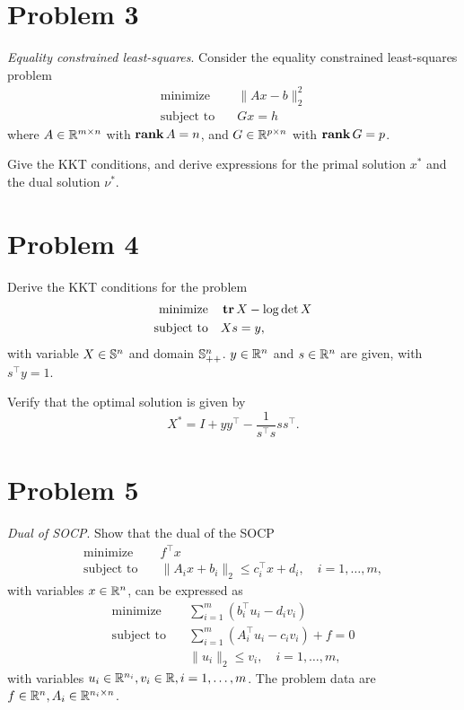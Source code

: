 \documentclass[11pt]{article}
\newcommand{\T}{^\top}          %
\begin{document}
\clearpage
\section*{Problem 3}
\textit{Equality constrained least-squares}. Consider the equality constrained least-squares problem
\begin{align*}
  \text{minimize} \quad & \|Ax - b\|^2_2\\
  \text{subject to} \quad & Gx = h
\end{align*}
where $A\in{{\mathbb{R}}}^{m\times n}$ with $\mathop{\textbf{rank}} A = n$, and $G \in{{\mathbb{R}}}^{p\times n}$ with $\mathop{\textbf{rank}} G = p$.

Give the KKT conditions, and derive expressions for the primal solution $x^*$ and the dual solution $\nu^*$.



\clearpage
\section*{Problem 4}
Derive the KKT conditions for the problem
\begin{align*}
  \text{minimize} \quad & \mathop{\textbf{tr}} X - \log\det X\\
  \text{subject to} \quad & Xs = y,
\end{align*}
with variable $X\in{{\mathbb{S}}}^n$ and domain ${{\mathbb{S}}}^n_{++}$. $y\in{{\mathbb{R}}}^n$ and $s\in{{\mathbb{R}}}^n$ are given, with $s\T y = 1$.

Verify that the optimal solution is given by
\[
  X^* = I + yy\T - \frac{1}{s\T s} s s\T.
\]


\clearpage
\section*{Problem 5}
\textit{Dual of SOCP}. Show that the dual of the SOCP
\begin{align*}
  \text{minimize} \quad & f\T x\\
  \text{subject to} \quad & \|A_i x + b_i\|_2 \leq c_i\T x + d_i, \quad i = 1, \dots, m,
\end{align*}
with variables $x\in{{\mathbb{R}}}^n$, can be expressed as 
\begin{align*}
  \text{minimize} \quad & \sum_{i=1}^{m} (b_i\T u_i - d_i v_i)\\
  \text{subject to} \quad & \sum_{i=1}^{m} (A_i\T u_i - c_i v_i) + f = 0\\
  & \|u_i\|_2 \leq v_i, \quad i = 1, \dots, m,
\end{align*}
with variables $u_i\in{{\mathbb{R}}}^{n_i}, v_i\in{{\mathbb{R}}}, i = 1, \dots, m$. The problem data are $f\in{{\mathbb{R}}}^n, A_i\in{{\mathbb{R}}}^{n_i\times n}$.
\end{document}
